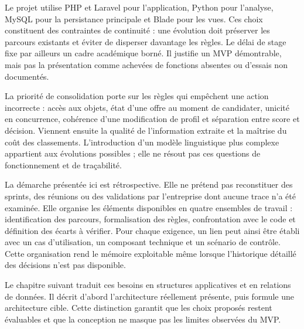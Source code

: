 Le projet utilise PHP et Laravel pour l'application, Python pour l'analyse, MySQL pour la persistance principale et Blade pour les vues. Ces choix constituent des contraintes de continuité : une évolution doit préserver les parcours existants et éviter de disperser davantage les règles. Le délai de stage fixe par ailleurs un cadre académique borné. Il justifie un MVP démontrable, mais pas la présentation comme achevées de fonctions absentes ou d'essais non documentés.

La priorité de consolidation porte sur les règles qui empêchent une action incorrecte : accès aux objets, état d'une offre au moment de candidater, unicité en concurrence, cohérence d'une modification de profil et séparation entre score et décision. Viennent ensuite la qualité de l'information extraite et la maîtrise du coût des classements. L'introduction d'un modèle linguistique plus complexe appartient aux évolutions possibles ; elle ne résout pas ces questions de fonctionnement et de traçabilité.

La démarche présentée ici est rétrospective. Elle ne prétend pas reconstituer des sprints, des réunions ou des validations par l'entreprise dont aucune trace n'a été examinée. Elle organise les éléments disponibles en quatre ensembles de travail : identification des parcours, formalisation des règles, confrontation avec le code et définition des écarts à vérifier. Pour chaque exigence, un lien peut ainsi être établi avec un cas d'utilisation, un composant technique et un scénario de contrôle. Cette organisation rend le mémoire exploitable même lorsque l'historique détaillé des décisions n'est pas disponible.

Le chapitre suivant traduit ces besoins en structures applicatives et en relations de données. Il décrit d'abord l'architecture réellement présente, puis formule une architecture cible. Cette distinction garantit que les choix proposés restent évaluables et que la conception ne masque pas les limites observées du MVP.
